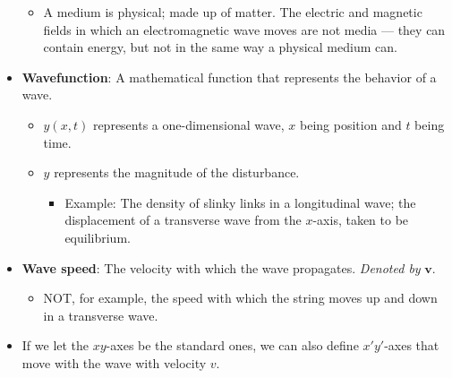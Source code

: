 \documentclass[../notes.tex]{subfiles}
\begin{document}
\begin{itemize}
\begin{itemize}
        \item A medium is physical; made up of matter. The electric and magnetic fields in which an electromagnetic wave moves are not media --- they can contain energy, but not in the same way a physical medium can.
    \end{itemize}
    \item \textbf{Wavefunction}: A mathematical function that represents the behavior of a wave.
    \begin{itemize}
        \item $y(x,t)$ represents a one-dimensional wave, $x$ being position and $t$ being time.
        \item $y$ represents the magnitude of the disturbance.
        \begin{itemize}
            \item Example: The density of slinky links in a longitudinal wave; the displacement of a transverse wave from the $x$-axis, taken to be equilibrium.
        \end{itemize}
    \end{itemize}
    \item \textbf{Wave speed}: The velocity with which the wave propagates. \emph{Denoted by} $\bm{v}$.
    \begin{itemize}
        \item NOT, for example, the speed with which the string moves up and down in a transverse wave.
    \end{itemize}
    \item If we let the $xy$-axes be the standard ones, we can also define $x'y'$-axes that move with the wave with velocity $v$.
    \begin{figure}[h!]
        \centering
\end{figure}
\end{itemize}
\end{document}
